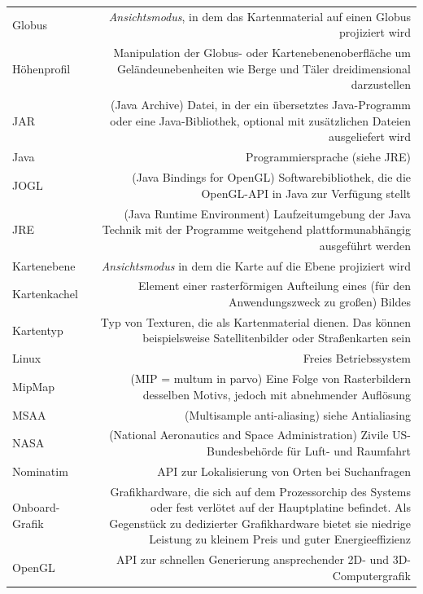 \documentclass[10pt]{scrreprt}
\newcommand{\textref}[1]{\mbox{\raisebox{0.1ex}{\small$\rightarrow$ }\textit{#1}}}
\begin{document}
\begin{longtabu}{L{0.35} R{1.65}}
Globus   & \textref{Ansichtsmodus}, in dem das Kartenmaterial auf einen Globus projiziert wird\\
Höhenprofil  & Manipulation der Globus- oder Kartenebenenoberfläche um Geländeunebenheiten wie Berge und Täler dreidimensional darzustellen\\
JAR & (Java Archive) Datei, in der ein übersetztes Java-Programm oder eine Java-Bibliothek, optional mit zusätzlichen Dateien ausgeliefert wird\\
Java  & Programmiersprache (siehe JRE)\\
JOGL  & (Java Bindings for OpenGL) Softwarebibliothek, die die OpenGL-API in Java zur Verfügung stellt\\
JRE & (Java Runtime Environment) Laufzeitumgebung der Java Technik mit der Programme weitgehend plattformunabhängig ausgeführt werden\\
Kartenebene   & \textref{Ansichtsmodus} in dem die Karte auf die Ebene projiziert wird\\
Kartenkachel  & Element einer rasterförmigen Aufteilung eines (für den Anwendungszweck zu großen) Bildes\\
Kartentyp & Typ von Texturen, die als Kartenmaterial dienen. Das können beispielsweise Satellitenbilder oder Straßenkarten sein\\
Linux & Freies Betriebssystem\\
MipMap & (MIP = multum in parvo) Eine Folge von Rasterbildern desselben Motivs, jedoch mit abnehmender Auflösung \\
MSAA   & (Multisample anti-aliasing) siehe Antialiasing\\
NASA  & (National Aeronautics and Space Administration) Zivile US-Bundesbehörde für Luft- und Raumfahrt\\
Nominatim  & API zur Lokalisierung von Orten bei Suchanfragen\\
Onboard-Grafik & Grafikhardware, die sich auf dem Prozessorchip des Systems oder fest verlötet auf der Hauptplatine befindet. Als Gegenstück zu dedizierter Grafikhardware bietet sie niedrige Leistung zu kleinem Preis und guter Energieeffizienz\\
OpenGL  & API zur schnellen Generierung ansprechender 2D- und 3D-Computergrafik\\

\end{longtabu}
\end{document}
